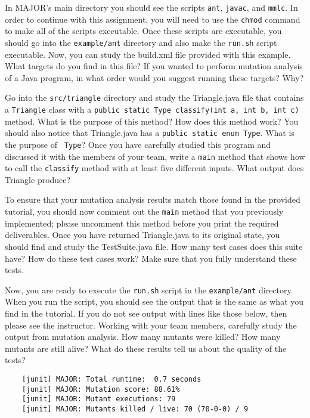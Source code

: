 In MAJOR's main directory you should see the scripts {\tt ant}, {\tt javac}, and {\tt mmlc}.  In order to continue
with this assignment, you will need to use the {\tt chmod} command to make all of the scripts executable.  Once these
scripts are executable, you should go into the {\tt example/ant} directory and also make the {\tt run.sh} script
executable.  Now, you can study the build.xml file provided with this example. What targets do you find in this file? If
you wanted to perform mutation analysis of a Java program, in what order would you suggest running these targets? Why?

Go into the {\tt src/triangle} directory and study the Triangle.java file that contains a {\tt Triangle} class with a
{\tt public static Type classify(int a, int b, int c)} method.  What is the purpose of this method? How does this method
work?  You should also notice that Triangle.java has a {\tt public static enum Type}.  What is the purpose of {\tt
Type}? Once you have carefully studied this program and discussed it with the members of your team, write a {\tt main}
method that shows how to call the {\tt classify} method with at least five different inputs. What output does Triangle
produce? 

To ensure that your mutation analysis results match those found in the provided tutorial, you should now comment out the
{\tt main} method that you previously implemented; please uncomment this method before you print the required
deliverables. Once you have returned Triangle.java to its original state, you should find and study the TestSuite.java
file.  How many test cases does this suite have? How do these test cases work? Make sure that you fully understand these
tests.

Now, you are ready to execute the {\tt run.sh} script in the {\tt example/ant} directory.  When you run the script, you
should see the output that is the same as what you find in the tutorial.  If you do not see output with lines like those
below, then please see the instructor. Working with your team members, carefully study the output from mutation
analysis.  How many mutants were killed? How many mutants are still alive? What do these results tell us about the
quality of the tests?

\begin{verbatim}
    [junit] MAJOR: Total runtime:  0.7 seconds
    [junit] MAJOR: Mutation score: 88.61%
    [junit] MAJOR: Mutant executions: 79
    [junit] MAJOR: Mutants killed / live: 70 (70-0-0) / 9
\end{verbatim}

